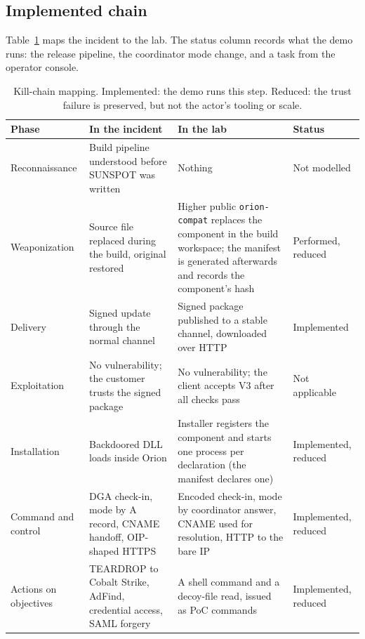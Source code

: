 \subsection{Implemented chain}

Table~\ref{tab:killchain} maps the incident to the lab. The status column records what the demo runs: the release pipeline, the coordinator mode change, and a task from the operator console.

\begin{table}[H]
\centering
\footnotesize
{}
\caption{Kill-chain mapping. Implemented: the demo runs this step. Reduced: the trust failure is preserved, but not the actor's tooling or scale.}
\label{tab:killchain}
\begin{tabular}{@{}>{\RaggedRight}p{2.3cm}>{\RaggedRight}p{4.7cm}>{\RaggedRight}p{4.7cm}>{\RaggedRight}p{2.5cm}@{}}
\toprule
\textbf{Phase} & \textbf{In the incident} & \textbf{In the lab} & \textbf{Status} \\
\midrule
Reconnaissance & Build pipeline understood before SUNSPOT was written~\cite{crowdstrike-sunspot} & Nothing & Not modelled \\
Weaponization & Source file replaced during the build, original restored~\cite{crowdstrike-sunspot} & Higher public \texttt{orion-compat} replaces the component in the build workspace; the manifest is generated afterwards and records the component's hash & Performed, reduced \\
Delivery & Signed update through the normal channel~\cite{mandiant-campaign} & Signed package published to a stable channel, downloaded over HTTP & Implemented \\
Exploitation & No vulnerability; the customer trusts the signed package & No vulnerability; the client accepts V3 after all checks pass & Not applicable \\
Installation & Backdoored DLL loads inside Orion & Installer registers the component and starts one process per declaration (the manifest declares one) & Implemented, reduced \\
Command and control & DGA check-in, mode by A record, CNAME handoff, OIP-shaped HTTPS & Encoded check-in, mode by coordinator answer, CNAME used for resolution, HTTP to the bare IP & Implemented, reduced \\
Actions on objectives & TEARDROP to Cobalt Strike, AdFind, credential access, SAML forgery & A shell command and a decoy-file read, issued as PoC commands & Implemented, reduced \\
\bottomrule
\end{tabular}
\end{table}

